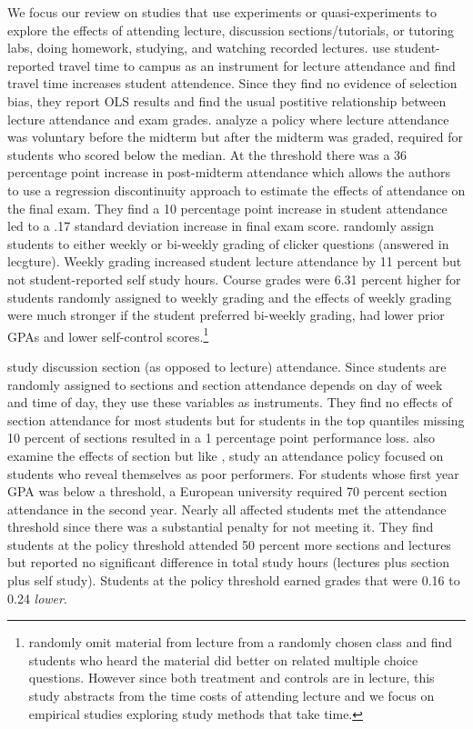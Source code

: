 \documentclass[12pt]{article}
\begin{document}
We focus our review on studies that use experiments or quasi-experiments to explore the effects of attending lecture, discussion sections/tutorials, or tutoring labs, doing homework, studying, and watching recorded lectures. \textcite{km2003} use student-reported travel time to campus as an instrument for lecture attendance and find travel time increases student attendence.  Since they find no evidence of selection bias, they report OLS results and find the usual postitive relationship between lecture attendance and exam grades.  \textcite{dgm2010} analyze a policy where lecture attendance was voluntary before the midterm but after the midterm was graded, required for students who scored below the median. At the threshold there was a 36 percentage point increase in post-midterm attendance which allows the authors to use a regression discontinuity approach to estimate the effects of attendance on the final exam.  They find a 10 percentage point increase in student attendance led to a .17 standard deviation increase in final exam score.
\textcite{tlad2020} randomly assign students to either weekly or bi-weekly grading of clicker questions (answered in lecgture). Weekly grading increased student lecture attendance by 11 percent but not student-reported self study hours. Course grades were 6.31 percent higher for students randomly assigned to weekly grading and the effects of weekly grading were much stronger if the student preferred bi-weekly grading, had lower prior GPAs and lower self-control scores.\footnote{\textcite{cl2008} randomly omit material from lecture from a randomly chosen class and find students who heard the material did better on related multiple choice questions.  However since both treatment and controls are in lecture, this study abstracts from the time costs of attending lecture and we focus on empirical studies exploring study methods that take time.}  

\textcite{ans2012} study discussion section (as opposed to lecture) attendance.  Since students are randomly assigned to sections and section attendance depends on day of week and time of day, they use these variables as instruments. They find no effects of section attendance for most students but for students in the top quantiles missing 10 percent of sections resulted in a 1 percentage point performance loss. \textcite{kow2020} also examine the effects of section but like \textcite{dgm2010}, study an attendance policy focused on students who reveal themselves as poor performers. For students whose first year GPA was below a threshold, a European university required 70 percent section attendance in the second year.  Nearly all affected students met the attendance threshold since there was a substantial penalty for not meeting it.  They find students at the policy threshold attended 50 percent more sections and lectures but reported no significant difference in total study hours (lectures plus section plus self study).  Students at the policy threshold earned grades that were 0.16 to 0.24 \textit{lower}. 
\end{document}
